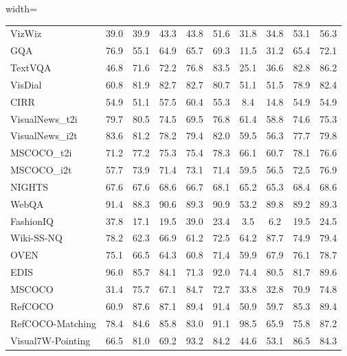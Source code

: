 \begin{table}[!t]
\begin{adjustbox}{width=\textwidth}
\begin{tabular}{l|ccccccccc}
        VizWiz & 39.0 & 39.9 & 43.3 & 43.8 & 51.6 & 31.8 & 34.8 & 53.1 & 56.3 \\
        GQA & 76.9 & 55.1 & 64.9 & 65.7 & 69.3 & 11.5 & 31.2 & 65.4 & 72.1 \\
        TextVQA & 46.8 & 71.6 & 72.2 & 76.8 & 83.5 & 25.1 & 36.6 & 82.8 & 86.2 \\
        VisDial & 60.8 & 81.9 & 82.7 & 82.7 & 80.7 & 51.1 & 51.5 & 78.9 & 82.4 \\
        CIRR & 54.9 & 51.1 & 57.5 & 60.4 & 55.3 & 8.4 & 14.8 & 54.9 & 54.9 \\
        VisualNews\_t2i & 79.7 & 80.5 & 74.5 & 69.5 & 76.8 & 61.4 & 58.8 & 74.6 & 75.3 \\
        VisualNews\_i2t & 83.6 & 81.2 & 78.2 & 79.4 & 82.0 & 59.5 & 56.3 & 77.7 & 79.8 \\
        MSCOCO\_t2i & 71.2 & 77.2 & 75.3 & 75.4 & 78.3 & 66.1 & 60.7 & 78.1 & 76.6 \\
        MSCOCO\_i2t & 57.7 & 73.9 & 71.4 & 73.1 & 71.4 & 59.5 & 56.5 & 72.5 & 76.9 \\
        NIGHTS & 67.6 & 67.6 & 68.6 & 66.7 & 68.1 & 65.2 & 65.3 & 68.4 & 68.6 \\
        WebQA & 91.4 & 88.3 & 90.6 & 89.3 & 90.9 & 53.2 & 89.8 & 89.2 & 89.3 \\
        FashionIQ & 37.8 & 17.1 & 19.5 & 39.0 & 23.4 & 3.5 & 6.2 & 19.5 & 24.5 \\
        Wiki-SS-NQ & 78.2 & 62.3 & 66.9 & 61.2 & 72.5 & 64.2 & 87.7 & 74.9 & 79.4 \\
        OVEN & 75.1 & 66.5 & 64.3 & 60.8 & 71.4 & 59.9 & 67.9 & 76.1 & 78.7 \\
        EDIS & 96.0 & 85.7 & 84.1 & 71.3 & 92.0 & 74.4 & 80.5 & 81.7 & 89.6 \\
        MSCOCO & 31.4 & 75.7 & 67.1 & 84.7 & 72.7 & 33.8 & 32.8 & 70.9 & 74.8 \\
        RefCOCO & 60.9 & 87.6 & 87.1 & 89.4 & 91.4 & 50.9 & 59.7 & 85.3 & 89.4 \\
        RefCOCO-Matching & 78.4 & 84.6 & 85.8 & 83.0 & 91.1 & 98.5 & 65.9 & 75.8 & 87.2 \\
        Visual7W-Pointing & 66.5 & 81.0 & 69.2 & 93.2 & 84.2 & 44.6 & 53.1 & 86.5 & 84.3 \\
        \bottomrule
    \end{tabular}
    \end{adjustbox}
\end{table}

